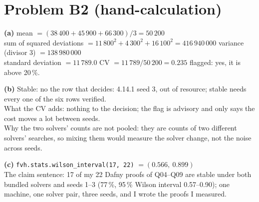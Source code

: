 \documentclass[11pt]{article}
\begin{document}
\section*{Problem B2 (hand-calculation)}\label{ans:B2}
\begin{answer}
\textbf{(a)} mean $= (38\,400 + 45\,900 + 66\,300)/3 = 50\,200$ \\
sum of squared deviations $= 11\,800^2 + 4\,300^2 + 16\,100^2 = 416\,940\,000$
\quad variance (divisor 3) $= 138\,980\,000$ \\
standard deviation $= 11\,789.0$ \quad CV $= 11\,789/50\,200 = 0.235$ \quad
flagged: yes, it is above 20\,\%.

\textbf{(b)} Stable: no \quad the row that decides: 4.14.1 seed 3, out of
resource; stable needs every one of the six rows verified. \\
What the CV adds: nothing to the decision; the flag is advisory and only says
the cost moves a lot between seeds. \\
Why the two solvers' counts are not pooled: they are counts of two different
solvers' searches, so mixing them would measure the solver change, not the
noise across seeds.

\textbf{(c)} \texttt{fvh.stats.wilson\_interval(17, 22)} $= (0.566,\ 0.899)$ \\
The claim sentence: 17 of my 22 Dafny proofs of Q04--Q09 are stable under both
bundled solvers and seeds 1--3 (77\,\%, 95\,\% Wilson interval 0.57--0.90);
one machine, one solver pair, three seeds, and I wrote the proofs I measured.
\end{answer}

\end{document}
